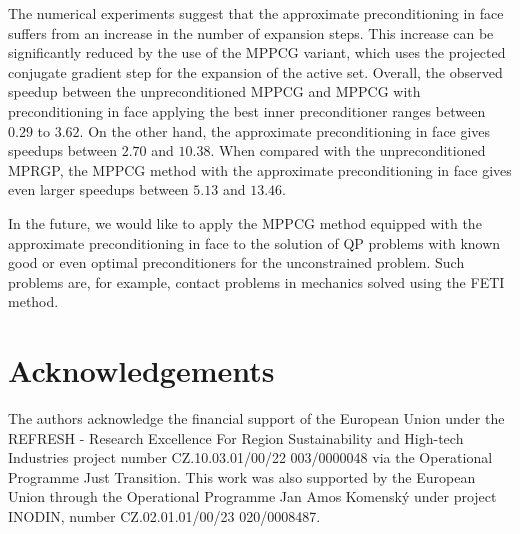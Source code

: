 \documentclass[11pt]{article}
\theoremstyle{plain}
\theoremstyle{definition}
\begin{document}
The numerical experiments suggest that the approximate preconditioning in face suffers from an increase in the number of expansion steps.
This increase can be significantly reduced by the use of the MPPCG variant, which uses the projected conjugate gradient step for the expansion of the active set.
Overall, the observed speedup between the unpreconditioned MPPCG and MPPCG with preconditioning in face applying the best inner preconditioner ranges between $0.29$ to $3.62$.
On the other hand, the approximate preconditioning in face gives speedups between $2.70$ and $10.38$. When compared with the unpreconditioned MPRGP, the MPPCG method with the approximate preconditioning in face gives even larger speedups between $5.13$ and $13.46$.

In the future, we would like to apply the MPPCG method equipped with the approximate preconditioning in face to the solution of QP problems with known good or even optimal preconditioners for the unconstrained problem.
Such problems are, for example, contact problems in mechanics solved using the FETI method.

\section*{Acknowledgements}
The authors acknowledge the financial support of the European Union under the REFRESH - Research Excellence For Region Sustainability and High-tech Industries project number CZ.10.03.01/00/22 003/0000048 via the Operational Programme Just Transition.
This work was also supported by the European Union through the Operational Programme Jan Amos Komenský under project INODIN, number CZ.02.01.01/00/23 020/0008487.


\printbibliography
\end{document}
